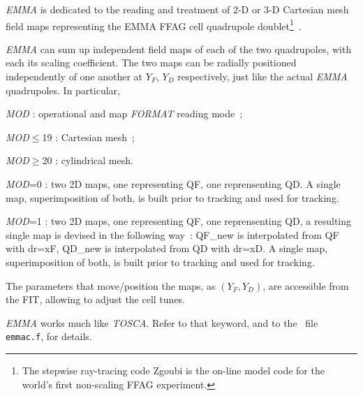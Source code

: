 {\noindent  \textsl{EMMA} is dedicated to the reading and treatment of 2-D or 
3-D Cartesian  mesh field maps representing the EMMA FFAG  cell quadrupole 
doublet\footnote{The stepwise ray-tracing code Zgoubi is the on-line model 
code for the world’s first non-scaling FFAG experiment.}~\cite{EMMAIPAC10,EMMA}. 

\medskip

\noindent  \textsl{EMMA}  can sum up independent field maps of each of the two quadrupoles, with each its 
scaling coefficient. The two maps can be radially  positioned independently of 
one another at $Y_F$, $Y_D$ respectively, just like the 
actual  \textsl{EMMA} quadrupoles. In particular, 

\medskip

  \textsl{MOD} : operational and map \textsl{FORMAT} reading mode~; 
  
  \textsl{MOD}$\le$19 : Cartesian mesh~; 
  
  \textsl{MOD}$\ge$20 : cylindrical mesh.

\medskip

  \textsl{MOD}=0 : two 2D maps, one representing QF, one reprensenting QD. 
 A single map, superimposition of both, is built prior to tracking
 and used for tracking. 


  \textsl{MOD}=1 : two 2D maps, one representing QF, one reprensenting QD, 
 a resulting single map is devised in the following way~: 
  QF\_new is interpolated from QF with dr=xF, 
  QD\_new is interpolated from QD with dr=xD. 
 A single map, superimposition of both, is built prior to tracking
 and used for tracking. 

%


\medskip

\noindent The parameters that move/position the maps, as $(Y_F,Y_D)$, 
                are accessible from the FIT, allowing to  adjust the cell tunes. 


\medskip

\noindent  \textsl{EMMA}    works much like  \textsl{TOSCA}.  Refer to that keyword, and to the \FORTRAN\ file 
\texttt{emmac.f}, for details. 









}
